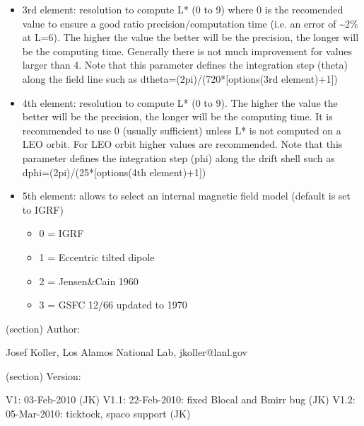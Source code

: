 \begin{boxedminipage}{\funcwidth}
\begin{itemize}
        \item 3rd element: resolution to compute L* (0 to 9) where 0 is the 
          recomended value to ensure a good ratio precision/computation 
          time (i.e. an error of {\textasciitilde}2\% at L=6). The higher 
          the value the better will be the precision, the longer will be 
          the computing time. Generally there is not much improvement for 
          values larger than 4. Note that this parameter defines the 
          integration step (theta) along the field line such as 
          dtheta=(2pi)/(720*[options(3rd element)+1])

        \item 4th element: resolution to compute L* (0 to 9). The higher the 
          value the better will be the precision, the longer will be the 
          computing time. It is recommended to use 0 (usually sufficient) 
          unless L* is not computed on a LEO orbit. For LEO orbit higher 
          values are recommended. Note that this parameter defines the 
          integration step (phi) along the drift shell such as 
          dphi=(2pi)/(25*[options(4th element)+1])

        \item 5th element: allows to select an internal magnetic field model 
          (default is set to IGRF)

          \begin{itemize}
          \setlength{\parskip}{0.6ex}
            \item 0 = IGRF

            \item 1 = Eccentric tilted dipole

            \item 2 = Jensen\&Cain 1960

            \item 3 = GSFC 12/66 updated to 1970

          \end{itemize}

      \end{itemize}

    (section) Author:

      Josef Koller, Los Alamos National Lab, jkoller@lanl.gov

    (section) Version:

      V1: 03-Feb-2010 (JK) V1.1: 22-Feb-2010: fixed Blocal and Bmirr bug 
      (JK) V1.2: 05-Mar-2010: ticktock, spaco support (JK)

\setlength{\parskip}{1ex}
    \end{boxedminipage}

